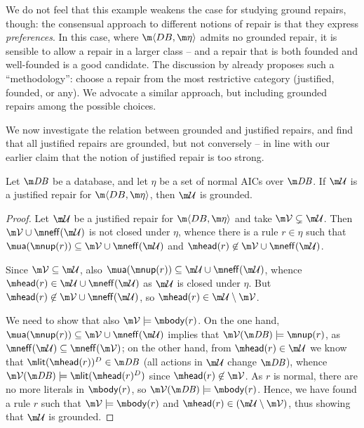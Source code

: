 We do not feel that this example weakens the case for studying ground repairs, though: the consensual approach to different notions of repair is that they express \emph{preferences}.
In this case, where $\fulldb$ admits no grounded repair, it is sensible to allow a repair in a larger class -- and a repair that is both founded and well-founded is a good candidate.
The discussion by \citet[Section 8]{tplp/CaropreseT11} already proposes such a ``methodology'': choose a repair from the most restrictive category (justified, founded, or any).
We advocate a similar approach, but including grounded repairs among the possible choices.


We now investigate the relation between grounded and justified repairs, and find that all justified repairs are grounded, but not conversely -- in line with our earlier claim that the notion of justified repair is too strong.

\begin{proposition}
  \label{prop:justified}
  Let $\db$ be a database, and let $\eta$ be a set of normal AICs over $\db$. If $\UU$ is a justified repair for $\fulldb$, then $\UU$ is grounded.
\end{proposition}
\begin{proof}
  Let $\UU$ be a justified repair for $\fulldb$ and take $\VV\subsetneq\UU$.
  Then $\VV\cup\neff(\UU)$ is not closed under $\eta$, whence there is a rule $r\in\eta$ such that $\actof(\nup(r))\subseteq\VV\cup\neff(\UU)$ and $\head(r)\not\in\VV\cup\neff(\UU)$.

  Since $\VV\subseteq\UU$, also $\actof(\nup(r))\subseteq\UU\cup\neff(\UU)$, whence $\head(r)\in\UU\cup\neff(\UU)$ as $\UU$ is closed under $\eta$.
  But $\head(r)\not\in\VV\cup\neff(\UU)$, so $\head(r)\in\UU\setminus\VV$.

  We need to show that also $\VV\models\body(r)$. On the one hand, $\actof(\nup(r))\subseteq\VV\cup\neff(\UU)$ implies that $\VV(\db)\models\nup(r)$, as $\neff(\UU)\subseteq\neff(\VV)$; on the other hand, from $\head(r)\in\UU$ we know that $\litof(\head(r))^D\in\db$ (all actions in $\UU$ change $\db$), whence $\VV(\db)\models\litof(\head(r)^D)$ since $\head(r)\not\in\VV$.
  As $r$ is normal, there are no more literals in $\body(r)$, so $\VV(\db)\models\body(r)$. 
  Hence, we have found a rule $r$ such that $\VV\models \body(r)$ and $\head(r)\in(\UU\setminus\VV)$, thus showing that $\UU$ is grounded.
\end{proof}

